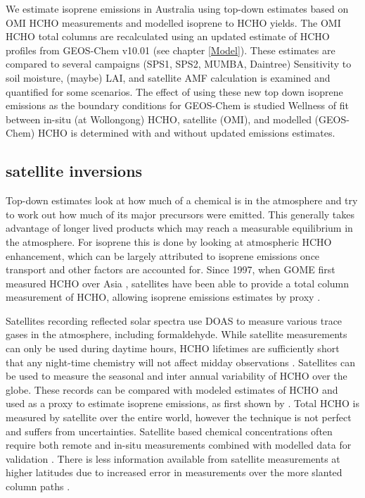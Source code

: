     We estimate isoprene emissions in Australia using top-down estimates based on OMI HCHO measurements and modelled isoprene to HCHO yields.
    The OMI HCHO total columns are recalculated using an updated estimate of HCHO profiles from GEOS-Chem v10.01 (see chapter \ref{Model}).
    These estimates are compared to several campaigns (SPS1, SPS2, MUMBA, Daintree) 
    Sensitivity to soil moisture, (maybe) LAI, and satellite AMF calculation is examined and quantified for some scenarios.
    The effect of using these new top down isoprene emissions as the boundary conditions for GEOS-Chem is studied
    Wellness of fit between in-situ (at Wollongong) HCHO, satellite (OMI), and modelled (GEOS-Chem) HCHO is determined with and without updated emissions estimates.
  
  \subsection{satellite inversions}
    \label{BioIsop:intro:satellite_inversion}
    Top-down estimates look at how much of a chemical is in the atmosphere and try to work out how much of its major precursors were emitted.
    This generally takes advantage of longer lived products which may reach a measurable equilibrium in the atmosphere.
    For isoprene this is done by looking at atmospheric HCHO enhancement, which can be largely attributed to isoprene emissions once transport and other factors are accounted for.
    Since 1997, when GOME first measured HCHO over Asia \parencite{Thomas1998}, satellites have been able to provide a total column measurement of HCHO, allowing isoprene emissions estimates by proxy \parencite{Palmer2001,Bauwens2016}.
    
    Satellites recording reflected solar spectra use DOAS to measure various trace gases in the atmosphere, including formaldehyde. 
    While satellite measurements can only be used during daytime hours, HCHO lifetimes are sufficiently short that any night-time chemistry will not affect midday observations \parencite{Wolfe2016}.
    Satellites can be used to measure the seasonal and inter annual variability of HCHO over the globe.
    These records can be compared with modeled estimates of HCHO and used as a proxy to estimate isoprene emissions, as first shown by \textcite{Palmer2001}.
    Total HCHO is measured by satellite over the entire world, however the technique is not perfect and suffers from uncertainties.
    Satellite based chemical concentrations often require both remote and in-situ measurements combined with modelled data for validation \parencite{Marais2014}.
    There is less information available from satellite measurements at higher latitudes due to increased error in measurements over the more slanted column paths \parencite{DeSmedt2015}.
    
